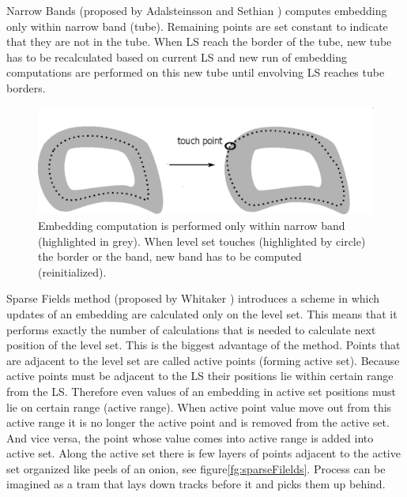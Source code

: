 Narrow Bands (proposed by Adalsteinsson and Sethian \cite{sethianFastLS}) computes embedding only within narrow band (tube).
Remaining points are set constant to indicate that they are not in the tube.
When LS reach the border of the tube, new tube has to be recalculated based on current LS and new run of embedding computations are performed on this new tube until envolving LS reaches tube borders.

\begin{figure}
    \centering
    \includegraphics[width=\textwidth]{data/narrowBands}
    \caption[Narrow bands computation illustration]{Embedding computation is performed only within narrow band (highlighted in grey). When level set touches (highlighted by circle) the border or the band, new band has to be computed (reinitialized).}
    \label{fg:narrowBands}
\end{figure}

Sparse Fields method (proposed by Whitaker \cite{sparseFilelds}) introduces a scheme in which updates of an embedding are calculated only on the level set.
This means that it performs exactly the number of calculations that is needed to calculate next position of the level set.
This is the biggest advantage of the method. Points that are adjacent to the level set are called active points (forming active set).
Because active points must be adjacent to the LS their positions lie within certain range from the LS.
Therefore even values of an embedding in active set positions must lie on certain range (active range).
When active point value move out from this active range it is no longer the active point and is removed from the active set.
And vice versa, the point whose value comes into active range is added into active set.
Along the active set there is few layers of points adjacent to the active set organized like peels of an onion, see figure\ref{fg:sparseFilelds}.
Process can be imagined as a tram that lays down tracks before it and picks them up behind.

